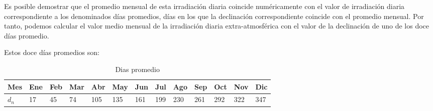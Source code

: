 Es posible demostrar que el promedio mensual de esta irradiación diaria coincide numéricamente con el valor de irradiación diaria correspondiente a los denominados días promedios, días en los que la declinación correspondiente coincide con el promedio mensual. Por tanto, podemos calcular el valor medio mensual de la irradiación diaria extra-atmosférica con el valor de la declinación de uno de los doce días promedio.

Estos doce días promedios son:

\begin{table}[ht]
\centering
\begin{tabular}{|l|l|l|l|l|l|l|l|l|l|l|l|l|}
\hline
Mes   & Ene & Feb & Mar & Abr & May & Jun & Jul & Ago & Sep & Oct & Nov & Dic \\ \hline
$d_n$ & 17  & 45  & 74  & 105  & 135  & 161  & 199  & 230  & 261  & 292  & 322 & 347  \\ \hline
\end{tabular}
\label{tab:dias_promedio}
\caption{Dias promedio}
\end{table}

